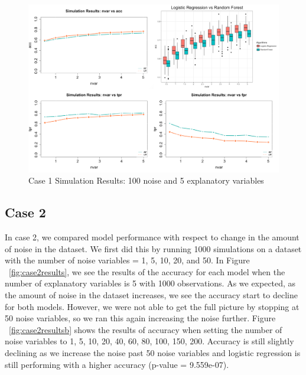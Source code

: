 \documentclass{llncs}
\begin{document}
\begin{figure}
\centering
\includegraphics[scale=0.55]{case1_b.png}
\caption{Case 1 Simulation Results: 100 noise and 5 explanatory variables}
\label{fig:case1resultsb}
\end{figure}

\subsection{Case 2}

In case 2, we compared model performance with respect to change in the amount of noise in the dataset. We first did this by running 1000 simulations on a dataset with the number of noise variables = 1, 5, 10, 20, and 50.  In Figure ~\ref{fig:case2results}, we see the results of the accuracy for each model when the number of explanatory variables is 5 with 1000 observations.  As we expected, as the amount of noise in the dataset increases, we see the accuracy start to decline for both models. However, we were not able to get the full picture by stopping at 50 noise variables, so we ran this again increasing the noise further.  Figure ~\ref{fig:case2resultsb} shows the results of accuracy when setting the number of noise variables to 1, 5, 10, 20, 40, 60, 80, 100, 150, 200.  Accuracy is still slightly declining as we increase the noise past 50 noise variables and logistic regression is still performing with a higher accuracy (p-value = 9.559e-07).
\end{document}
